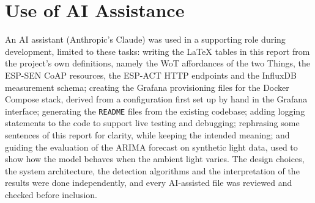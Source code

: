 \documentclass[conference]{IEEEtran}
\begin{document}
\section*{Use of AI Assistance}
An AI assistant (Anthropic's Claude) was used in a supporting role during development, limited to these tasks: writing the \LaTeX{} tables in this report from the project's own definitions, namely the WoT affordances of the two Things, the ESP-SEN CoAP resources, the ESP-ACT HTTP endpoints and the InfluxDB measurement schema; creating the Grafana provisioning files for the Docker Compose stack, derived from a configuration first set up by hand in the Grafana interface; generating the \texttt{README} files from the existing codebase; adding logging statements to the code to support live testing and debugging; rephrasing some sentences of this report for clarity, while keeping the intended meaning; and guiding the evaluation of the ARIMA forecast on synthetic light data, used to show how the model behaves when the ambient light varies. The design choices, the system architecture, the detection algorithms and the interpretation of the results were done independently, and every AI-assisted file was reviewed and checked before inclusion.
\end{document}
